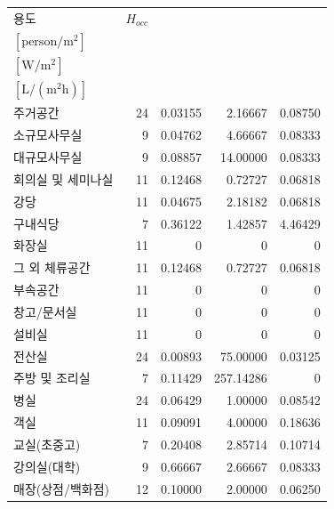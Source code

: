 \begin{defaulttable}
  \caption{현재 내장 프로필의 시간별 변환 결과}
  \label{tab:profile-derived-value}
  {\small
  \renewcommand{\arraystretch}{1.08}
  \begin{tabularx}{\textwidth}{Xrrrr}
    \toprule
    용도
      & $H_{occ}$
      & \makecell[r]{$n_{occ}$\\$[\mathrm{person/m^2}]$}
      & \makecell[r]{$p_{equip}$\\$[\mathrm{W/m^2}]$}
      & \makecell[r]{$v_{dhw}$\\$[\mathrm{L/(m^2h)}]$} \\ \midrule

    주거공간                & 24 & 0.03155 & 2.16667   & 0.08750 \\
    소규모사무실            & 9  & 0.04762 & 4.66667   & 0.08333 \\
    대규모사무실            & 9  & 0.08857 & 14.00000  & 0.08333 \\
    회의실 및 세미나실      & 11 & 0.12468 & 0.72727   & 0.06818 \\
    강당                    & 11 & 0.04675 & 2.18182   & 0.06818 \\
    구내식당                & 7  & 0.36122 & 1.42857   & 4.46429 \\
    화장실                  & 11 & 0       & 0         & 0       \\
    그 외 체류공간          & 11 & 0.12468 & 0.72727   & 0.06818 \\
    부속공간                & 11 & 0       & 0         & 0       \\
    창고/문서실           & 11 & 0       & 0         & 0       \\
    설비실              & 11 & 0       & 0         & 0       \\
    전산실                  & 24 & 0.00893 & 75.00000  & 0.03125 \\
    주방 및 조리실          & 7  & 0.11429 & 257.14286 & 0       \\
    병실                    & 24 & 0.06429 & 1.00000   & 0.08542 \\
    객실                    & 11 & 0.09091 & 4.00000   & 0.18636 \\
    교실(초중고)            & 7  & 0.20408 & 2.85714   & 0.10714 \\
    강의실(대학)            & 9  & 0.66667 & 2.66667   & 0.08333 \\
    매장(상점/백화점)       & 12 & 0.10000 & 2.00000   & 0.06250 \\

\end{tabularx}}
\end{defaulttable}
